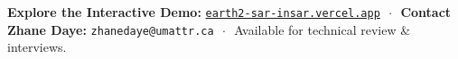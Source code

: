 \documentclass[10pt,letterpaper]{article}
\begin{document}
\vspace{-2pt}

\begin{tcolorbox}[colframe=mdanavy,colback=mdanavy,coltext=white,boxrule=0pt,top=4pt,bottom=4pt]
\centering\footnotesize
\textbf{Explore the Interactive Demo:} \href{https://earth2-sar-insar.vercel.app}{\texttt{earth2-sar-insar.vercel.app}} $\,\cdot\,$ 
\textbf{Contact Zhane Daye:} \texttt{zhanedaye@umattr.ca} $\,\cdot\,$ Available for technical review \& interviews.
\end{tcolorbox}
\end{document}
